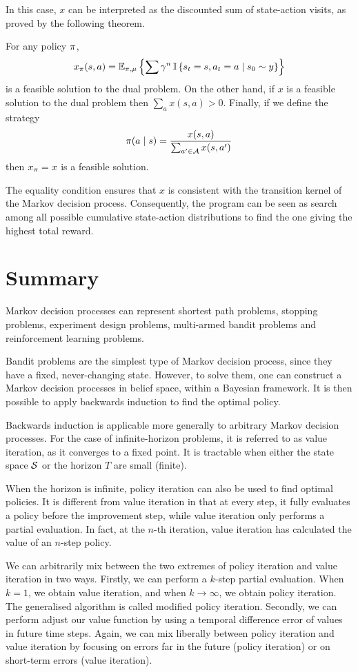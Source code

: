 In this case, $x$ can be interpreted as the discounted sum of state-action visits, as proved by the following theorem.
\begin{theorem}
  For any policy $\pi$,
  \[
  x_\pol(s,a) = \E_{\pol,\mdp} \left\{ \sum \disc^n \ind{s_t = s, a_t = a \mid s_0 \sim y}\right\}  %
  \]
  is a feasible solution to the dual problem.
  On the other hand, if $x$ is a feasible solution to the dual problem then $\sum_a x(s,a) > 0$. Finally, if we define the strategy
  \[
  \pi(a \mid s) = \frac{x(s,a)}{\sum_{a' \in \CA} x(s,a')}  %
  \]
  then $x_\pi = x$ is a feasible solution.
\end{theorem}
The equality condition ensures that $x$ is consistent with the transition kernel of the Markov decision process. Consequently, the program can be seen as search among all possible cumulative state-action distributions to find the one giving the highest total reward.



\section{Summary}
Markov decision processes can represent shortest path problems,
stopping problems, experiment design problems,
multi-armed bandit problems and reinforcement learning problems.

Bandit problems are the simplest type of Markov decision process, since they have a fixed, never-changing state. However, to solve them, one can  construct a Markov decision processes in belief space, within a Bayesian framework. It is then possible to apply backwards induction to find the optimal policy.

Backwards induction is applicable more generally to arbitrary Markov decision processes. For the case of infinite-horizon problems, it is referred to as value iteration, as it converges to a fixed point.
It is tractable when either the state space ${\mathcal{S}}$ or the horizon
$T$ are small (finite).

When the horizon is infinite, policy iteration can also be used to find optimal policies. It is different from value iteration in that at every step, it fully evaluates a policy before the improvement step, while value iteration only performs a partial evaluation. In fact, at the $n$-th iteration, value iteration has calculated the value of an $n$-step policy. 

We can arbitrarily mix between the two extremes of policy iteration and value iteration in two ways. Firstly, we can perform a $k$-step partial evaluation. When $k=1$, we obtain value iteration, and when $k \to \infty$, we obtain policy iteration. The generalised algorithm is called modified policy iteration. Secondly, we can perform adjust our value function by using a temporal difference error of values in future time steps. Again, we can mix liberally between policy iteration and value iteration by focusing on errors far in the future (policy iteration) or on short-term errors (value iteration).


